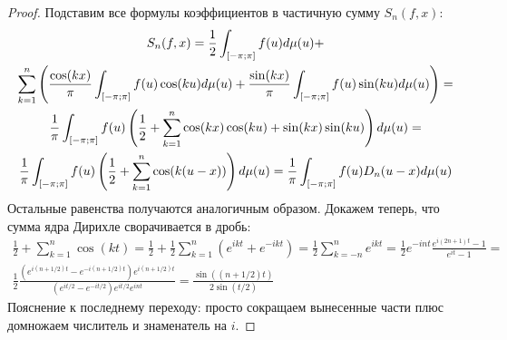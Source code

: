 \begin{proof}
	Подставим все формулы коэффициентов в частичную сумму $S_n(f, x)$:
	\begin{multline*}
		S_n(f, x) = \frac{1}{2}\int_{[-\pi; \pi]} f(u)d\mu(u) +
		\\
		\sum_{k = 1}^n \left(\frac{\cos(kx)}{\pi}\int_{[-\pi; \pi]} f(u)\cos(ku)d\mu(u) + \frac{\sin(kx)}{\pi}\int_{[-\pi; \pi]} f(u)\sin(ku)d\mu(u)\right) =
		\\
		\frac{1}{\pi} \int_{[-\pi; \pi]} f(u)\left(\frac{1}{2} + \sum_{k = 1}^n \cos(kx)\cos(ku) + \sin(kx)\sin(ku)\right)d\mu(u) =
		\\
		\frac{1}{\pi} \int_{[-\pi; \pi]} f(u)\left(\frac{1}{2} + \sum_{k = 1}^n \cos(k(u - x))\right)d\mu(u) = \frac{1}{\pi} \int_{[-\pi; \pi]} f(u)D_n(u - x)d\mu(u)
	\end{multline*}
	Остальные равенства получаются аналогичным образом. Докажем теперь, что сумма ядра Дирихле сворачивается в дробь:
	\begin{multline*}
		\frac{1}{2} + \sum_{k = 1}^n \cos(kt) = \frac{1}{2} + \frac{1}{2}\sum_{k = 1}^n (e^{ikt} + e^{-ikt}) = \frac{1}{2} \sum_{k = -n}^n e^{ikt} = \frac{1}{2} e^{-int} \frac{e^{i(2n + 1)t} - 1}{e^{it} - 1} =
		\\
		\frac{1}{2}\frac{(e^{i(n + 1/2)t} - e^{-i(n + 1/2)t})e^{i(n + 1/2)t}}{(e^{it/2} - e^{-it/2})e^{it/2}e^{int}} = \frac{\sin((n + 1/2)t)}{2\sin(t/2)}
	\end{multline*}
	Пояснение к последнему переходу: просто сокращаем вынесенные части плюс домножаем числитель и знаменатель на $i$.
\end{proof}